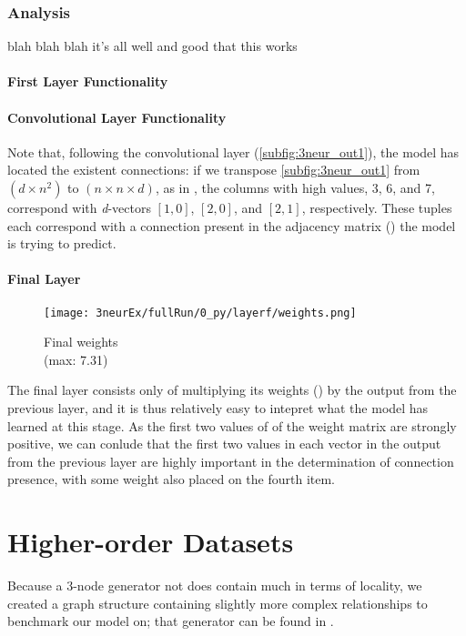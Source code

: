\subsubsection{Analysis}
blah blah blah it's all well and good that this works

\paragraph{First Layer Functionality}

\paragraph{Convolutional Layer Functionality}

Note that, following the convolutional layer (\ref{subfig:3neur_out1}), the 
model has located the existent connections: if we transpose 
\ref{subfig:3neur_out1} from $(d \times n^2)$ to $(n \times n \times d)$, as in 
, the columns with high values, 3, 6, and 7, correspond 
with \textit{d}-vectors $[1,0]$, $[2,0]$, and $[2,1]$, respectively. These 
tuples each correspond with a connection present in the adjacency matrix 
() the model is trying to predict. 

\paragraph{Final Layer}
\begin{wrapfigure}[5]{r}{.25\textwidth}
	\centering
	\vspace{-15pt}
	\texttt{[image: 3neurEx/fullRun/0\_py/layerf/weights.png]}
	\caption{Final weights\\(max: 7.31)}
	\label{fig:3neur_flayer}
\end{wrapfigure}
The final layer consists only of multiplying its weights 
() by the output from the previous layer, and it is 
thus relatively easy to intepret what the model has learned at this stage. As 
the first two values of of the weight matrix are strongly positive, we can 
conlude that the first two values in each vector in the output from the previous 
layer are highly important in the determination of connection presence, with 
some weight also placed on the fourth item.

\section{Higher-order Datasets}
Because a 3-node generator not does contain much in terms of locality, we 
created a graph structure containing slightly more complex relationships to 
benchmark our model on; that generator can be found in .

